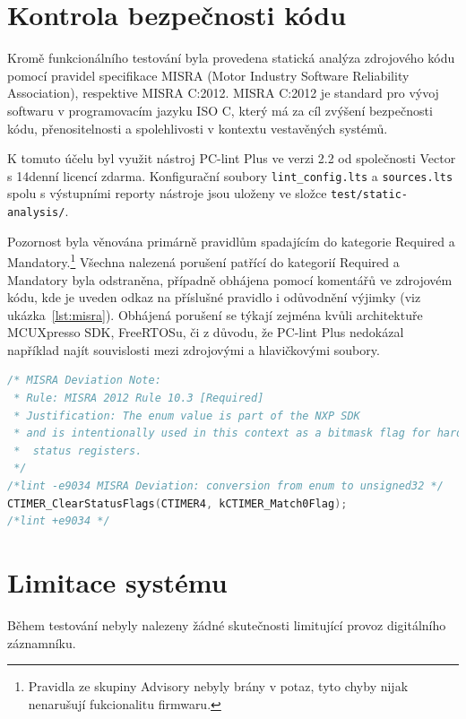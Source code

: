 \section{Kontrola bezpečnosti kódu}
Kromě funkcionálního testování byla provedena statická analýza zdrojového kódu pomocí pravidel specifikace MISRA (Motor Industry Software Reliability Association), respektive MISRA C:2012. MISRA C:2012 je standard pro vývoj softwaru v programovacím jazyku ISO C, který má za cíl zvýšení bezpečnosti kódu, přenositelnosti a spolehlivosti v kontextu vestavěných systémů.

K tomuto účelu byl využit nástroj PC-lint Plus ve verzi 2.2 od společnosti Vector s 14denní licencí zdarma. Konfigurační soubory \texttt{lint\_config.lts} a \texttt{sources.lts} spolu s výstupními reporty nástroje jsou uloženy ve složce \texttt{test/static-analysis/}.

Pozornost byla věnována primárně pravidlům spadajícím do kategorie Required a Mandatory.\footnote{Pravidla ze skupiny Advisory nebyly brány v potaz, tyto chyby nijak nenarušují fukcionalitu firmwaru.} Všechna nalezená porušení patřící do kategorií Required a Mandatory byla odstraněna, případně obhájena pomocí komentářů ve zdrojovém kódu, kde je uveden odkaz na příslušné pravidlo i odůvodnění výjimky (viz ukázka~\ref{lst:misra}). Obhájená porušení se týkají zejména kvůli architektuře MCUXpresso SDK, FreeRTOSu, či z důvodu, že PC-lint Plus nedokázal například najít souvislosti mezi zdrojovými a hlavičkovými soubory.

\begin{lstlisting}[language=C, caption={Ukázka odůvodněného porušení pravidla MISRA}, label={lst:misra}]
/* MISRA Deviation Note:
 * Rule: MISRA 2012 Rule 10.3 [Required]
 * Justification: The enum value is part of the NXP SDK
 * and is intentionally used in this context as a bitmask flag for hardware 
 *  status registers.
 */
/*lint -e9034 MISRA Deviation: conversion from enum to unsigned32 */
CTIMER_ClearStatusFlags(CTIMER4, kCTIMER_Match0Flag);
/*lint +e9034 */
\end{lstlisting}


\section{Limitace systému}
\label{limitace}
Během testování nebyly nalezeny žádné skutečnosti limitující provoz digitálního záznamníku.

